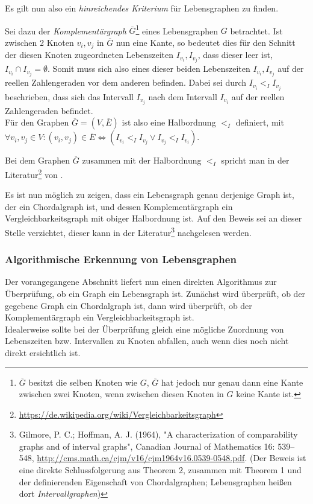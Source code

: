 Es gilt nun also ein \emph{hinreichendes Kriterium} für Lebensgraphen zu finden.

Sei dazu der \emph{Komplementärgraph} $\overline{G}$\footnote{$\overline{G}$ besitzt die selben Knoten wie $G$, $\overline{G}$ hat jedoch nur genau dann eine Kante zwischen zwei Knoten, wenn zwischen diesen Knoten in $G$ keine Kante ist.} eines Lebensgraphen $G$ betrachtet. Ist zwischen 2 Knoten $v_i, v_j$ in $\overline{G}$ nun eine Kante, so bedeutet dies für den Schnitt der diesen Knoten zugeordneten Lebenszeiten  $I_{v_i}, I_{v_j}$, dass dieser leer ist,  $I_{v_i} \cap I_{v_j} = \emptyset$. Somit muss sich also eines dieser beiden Lebenszeiten $I_{v_i}, I_{v_j}$ auf der reellen Zahlengeraden vor dem anderen befinden. Dabei sei durch $I_{v_i} <_I  I_{v_j}$ beschrieben, dass sich das Intervall $I_{v_j}$ nach dem Intervall $ I_{v_i}$  auf der reellen Zahlengeraden befindet.\\
Für den Graphen $\overline{G} = (V,\overline{E})$ ist also eine Halbordnung $<_I$ definiert, mit $\forall v_i, v_j \in V: (v_i,v_j) \in \overline{E} \Leftrightarrow (I_{v_i} <_I I_{v_j} \vee I_{v_j} <_I I_{v_i})$.

Bei dem Graphen $\overline{G}$ zusammen mit der Halbordnung $<_I$ spricht man in der Literatur\footnote{\url{https://de.wikipedia.org/wiki/Vergleichbarkeitsgraph}} von .

Es ist nun möglich zu zeigen, dass ein Lebensgraph genau derjenige Graph ist, der ein Chordalgraph ist, und dessen Komplementärgraph ein Vergleichbarkeitsgraph mit obiger Halbordnung ist. Auf den Beweis sei an dieser Stelle verzichtet, dieser kann in der Literatur\footnote{Gilmore, P. C.; Hoffman, A. J. (1964), "\phantom{,}A characterization of comparability graphs and of interval graphs", Canadian Journal of Mathematics 16: 539–548, \url{http://cms.math.ca/cjm/v16/cjm1964v16.0539-0548.pdf}. (Der Beweis ist eine direkte Schlussfolgerung aus Theorem 2, zusammen mit Theorem 1 und der definierenden Eigenschaft von Chordalgraphen; Lebensgraphen heißen dort \emph{Intervallgraphen})} nachgelesen werden. 

\subsubsection{Algorithmische Erkennung von Lebensgraphen}

Der vorangegangene Abschnitt liefert nun einen direkten Algorithmus zur Überprüfung, ob ein Graph ein Lebensgraph ist. Zunächst wird überprüft, ob der gegebene Graph ein Chordalgraph ist, dann wird überprüft, ob der Komplementärgraph ein Vergleichbarkeitsgraph ist.\\
Idealerweise sollte bei der Überprüfung gleich eine mögliche Zuordnung von Lebenszeiten bzw. Intervallen zu Knoten abfallen, auch wenn dies noch nicht direkt ersichtlich ist.

